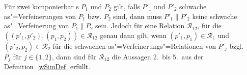 \begin{Lem}
  \label{schwVerfParallelLem}
  Für zwei komponierbar \MEIO{}s $P_1$ und $P_2$ gilt, falls $P'_1$ und $P'_2$
  schwache as"=Verfeinerungen von $P_1$ bzw. $P_2$ sind, dann muss $P'_1\|P'_2$
  keine schwache as"=Verfeinerung von $P_1\|P_2$ sein. Jedoch für eine Relation
  $\mathcal{R}_{12}$, für die $((p'_1,p'_2),(p_1,p_2)) \in \mathcal{R}_{12}$
  genau dann gilt, wenn $(p'_1,p_1)\in\mathcal{R}_1$ und
  $(p'_2,p_2)\in\mathcal{R}_2$ für die schwachen as"=Verfeinerungs"=Relationen
  von $P'_j$ bzgl.\ $P_j$ für $j\in\{1,2\}$, dann sind für $\mathcal{R}_{12}$
  die Aussagen 2.\ bis 5.\ aus der Definition~\ref{wSimDef} erfüllt.
  \\ 
\end{Lem}
